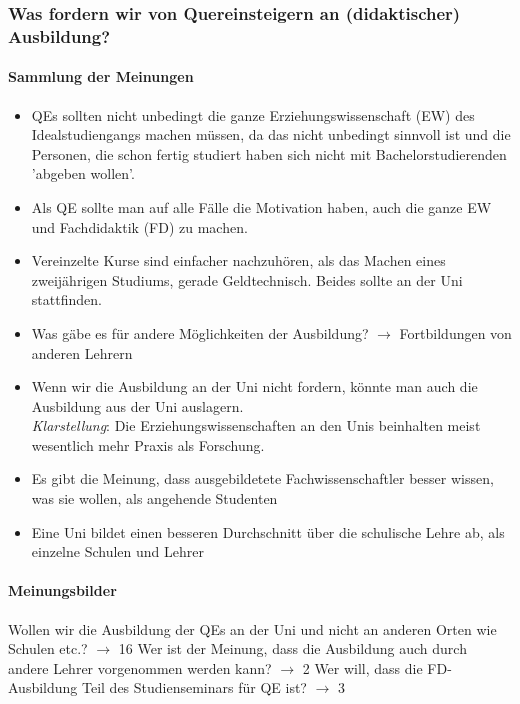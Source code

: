     \subsubsection{Was fordern wir von Quereinsteigern an (didaktischer) Ausbildung?}
      \paragraph{Sammlung der Meinungen}
        \begin{itemize}
          \item QEs sollten nicht unbedingt die ganze Erziehungswissenschaft (EW) des Idealstudiengangs machen müssen, da das nicht unbedingt sinnvoll ist und die Personen, die schon fertig studiert haben sich nicht mit Bachelorstudierenden 'abgeben wollen'.
          \item Als QE sollte man auf alle Fälle die Motivation haben, auch die ganze EW und Fachdidaktik (FD) zu machen.
          \item Vereinzelte Kurse sind einfacher nachzuhören, als das Machen eines zweijährigen Studiums, gerade Geldtechnisch. Beides sollte an der Uni stattfinden.
          \item Was gäbe es für andere Möglichkeiten der Ausbildung? $\rightarrow$ Fortbildungen von anderen Lehrern
          \item Wenn wir die Ausbildung an der Uni nicht fordern, könnte man auch die Ausbildung aus der Uni auslagern. \\ \textit{Klarstellung}: Die Erziehungswissenschaften an den Unis beinhalten meist wesentlich mehr Praxis als Forschung.
          \item Es gibt die Meinung, dass ausgebildetete Fachwissenschaftler besser wissen, was sie wollen, als angehende Studenten
          \item Eine Uni bildet einen besseren Durchschnitt über die schulische Lehre ab, als einzelne Schulen und Lehrer
        \end{itemize}

      \paragraph{Meinungsbilder}
        \begin{outline}
          \1 Wollen wir die Ausbildung der QEs an der Uni und nicht an anderen Orten wie Schulen etc.? $\rightarrow$ 16
          \1 Wer ist der Meinung, dass die Ausbildung auch durch andere Lehrer vorgenommen werden kann? $\rightarrow$ 2
          \1 Wer will, dass die FD-Ausbildung Teil des Studienseminars für QE ist? $\rightarrow$ 3
        \end{outline}

